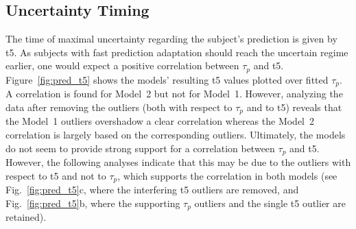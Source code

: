 \documentclass[a4paper]{scrreprt}
\begin{document}
\subsection{Uncertainty Timing}
\label{sec:t5}

The time of maximal uncertainty regarding the subject's prediction is given by t5. As subjects with fast prediction adaptation should reach the uncertain regime earlier, one would expect a positive correlation between $\tau_p$ and t5. Figure~\ref{fig:pred_t5} shows the models' resulting t5 values plotted over fitted $\tau_p$. A correlation is found for Model~2 but not for Model~1. However, analyzing the data after removing the outliers (both with respect to $\tau_p$ and to t5) reveals that the Model~1 outliers overshadow a clear correlation whereas the Model~2 correlation is largely based on the corresponding outliers. Ultimately, the models do not seem to provide strong support for a correlation between $\tau_p$ and t5. However, the following analyses indicate that this may be due to the outliers with respect to t5 and not to $\tau_p$, which supports the correlation in both models (see Fig.~\ref{fig:pred_t5}c, where the interfering t5 outliers are removed, and Fig.~\ref{fig:pred_t5}b, where the supporting $\tau_p$ outliers and the single t5 outlier are retained).
\end{document}
